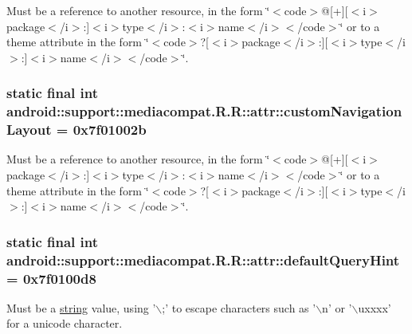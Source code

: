 Must be a reference to another resource, in the form \char`\"{}$<$code$>$@\mbox{[}+\mbox{]}\mbox{[}$<$i$>$package$<$/i$>$:\mbox{]}$<$i$>$type$<$/i$>$:$<$i$>$name$<$/i$>$$<$/code$>$\char`\"{} or to a theme attribute in the form \char`\"{}$<$code$>$?\mbox{[}$<$i$>$package$<$/i$>$:\mbox{]}\mbox{[}$<$i$>$type$<$/i$>$:\mbox{]}$<$i$>$name$<$/i$>$$<$/code$>$\char`\"{}. \hypertarget{classandroid_1_1support_1_1mediacompat_1_1_r_1_1attr_43db4388d063b5f80ad749b211a2d948}{
\subsubsection[{customNavigationLayout}]{\setlength{\rightskip}{0pt plus 5cm}static final int android::support::mediacompat.R.R::attr::customNavigationLayout = 0x7f01002b}}
\label{classandroid_1_1support_1_1mediacompat_1_1_r_1_1attr_43db4388d063b5f80ad749b211a2d948}


Must be a reference to another resource, in the form \char`\"{}$<$code$>$@\mbox{[}+\mbox{]}\mbox{[}$<$i$>$package$<$/i$>$:\mbox{]}$<$i$>$type$<$/i$>$:$<$i$>$name$<$/i$>$$<$/code$>$\char`\"{} or to a theme attribute in the form \char`\"{}$<$code$>$?\mbox{[}$<$i$>$package$<$/i$>$:\mbox{]}\mbox{[}$<$i$>$type$<$/i$>$:\mbox{]}$<$i$>$name$<$/i$>$$<$/code$>$\char`\"{}. \hypertarget{classandroid_1_1support_1_1mediacompat_1_1_r_1_1attr_235a41382c863edcb041c52b2148dbd7}{
\subsubsection[{defaultQueryHint}]{\setlength{\rightskip}{0pt plus 5cm}static final int android::support::mediacompat.R.R::attr::defaultQueryHint = 0x7f0100d8}}
\label{classandroid_1_1support_1_1mediacompat_1_1_r_1_1attr_235a41382c863edcb041c52b2148dbd7}


Must be a \hyperlink{classandroid_1_1support_1_1mediacompat_1_1_r_1_1string}{string} value, using '$\backslash$;' to escape characters such as '$\backslash$n' or '$\backslash$uxxxx' for a unicode character. 

